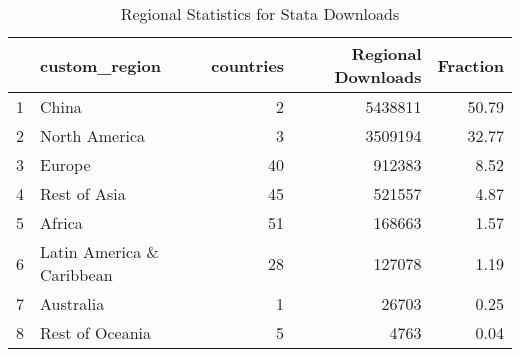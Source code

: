 \begin{table}[ht]
\centering
\begin{tabular}{rlrrr}
  \hline
 & custom\_region & countries & Regional Downloads & Fraction \\ 
  \hline
1 & China &   2 & 5438811 & 50.79 \\ 
  2 & North America &   3 & 3509194 & 32.77 \\ 
  3 & Europe &  40 & 912383 & 8.52 \\ 
  4 & Rest of Asia &  45 & 521557 & 4.87 \\ 
  5 & Africa &  51 & 168663 & 1.57 \\ 
  6 & Latin America \& Caribbean &  28 & 127078 & 1.19 \\ 
  7 & Australia &   1 & 26703 & 0.25 \\ 
  8 & Rest of Oceania &   5 & 4763 & 0.04 \\ 
   \hline
\end{tabular}
\caption{Regional Statistics for Stata Downloads} 
\label{tab:stata_downloads_regional_stats_select}
\end{table}
